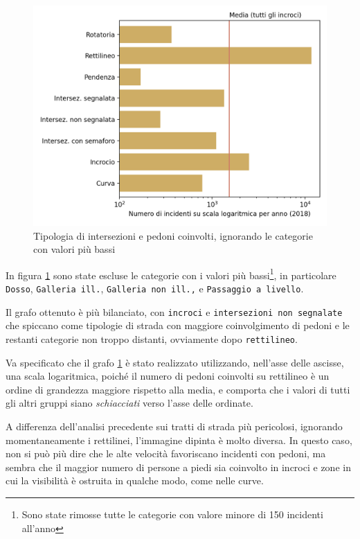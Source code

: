 \documentclass[a4paper,12pt]{report}
\newcommand{\columnstyle}[1]{\texttt{#1}}
\newcommand{\quotestyle}[1]{\textit{#1}}
\begin{document}
\begin{figure}
    \includegraphics[width=\linewidth]{../src/incidenti/incidenti_senza_coords/pedoni/pedoni_no_rett.png}
    \caption{Tipologia di intersezioni e pedoni coinvolti, ignorando le categorie con valori più bassi}
    \label{fig:pedoni-no-rett}
\end{figure}

In figura \ref{fig:pedoni-no-rett} sono state 
escluse le categorie con i valori 
più bassi\footnote{Sono state rimosse tutte le categorie con valore minore di 
150 incidenti all'anno}, 
in particolare \columnstyle{Dosso}, \columnstyle{Galleria ill.}, 
\columnstyle{Galleria non ill.,} e \columnstyle{Passaggio a livello}. 

Il grafo ottenuto è più bilanciato, con \columnstyle{incroci} e 
\columnstyle{intersezioni non segnalate} che spiccano come tipologie di strada con 
maggiore coinvolgimento di pedoni e le restanti categorie non troppo distanti, 
ovviamente dopo \columnstyle{rettilineo}. 

Va specificato che il grafo \ref{fig:pedoni-no-rett} è stato realizzato utilizzando, 
nell'asse delle ascisse, una scala logaritmica, poiché il numero di pedoni coinvolti 
su rettilineo è un ordine di grandezza maggiore rispetto alla media, e 
comporta che i valori di tutti gli altri gruppi siano \quotestyle{schiacciati} 
verso l'asse delle ordinate. 

A differenza dell'analisi precedente sui tratti di strada più pericolosi, 
ignorando momentaneamente i rettilinei, l'immagine dipinta è molto diversa. 
In questo caso, non si può più dire che le alte velocità favoriscano incidenti con pedoni, 
ma sembra che il maggior numero di persone a piedi 
sia coinvolto in incroci e zone in cui la visibilità è ostruita in 
qualche modo, come nelle curve. 
\end{document}
